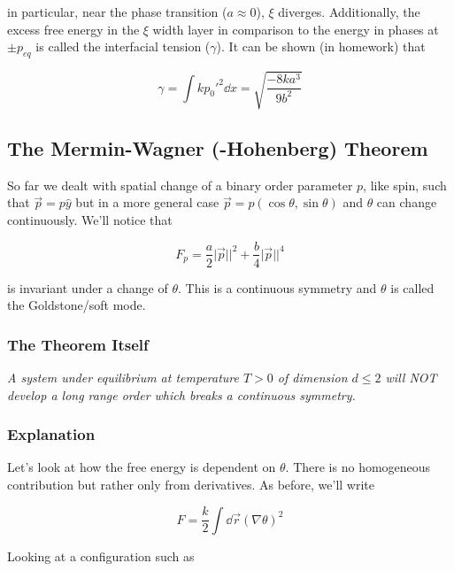 in particular, near the phase transition (\(a\approx 0\)), \(\xi \) diverges. Additionally, the excess free energy in the \(\xi \) width layer in comparison to the energy in phases at \(\pm p_{eq}\) is called the interfacial tension (\(\gamma \)). It can be shown (in homework) that 

\begin{equation}
	\gamma = \int kp_0'^2\dd x = \sqrt{\frac{-8ka^3}{9b^2}}
\end{equation}

\subsection{The Mermin-Wagner (-Hohenberg) Theorem}

So far we dealt with spatial change of a binary order parameter \(p\), like spin, such that \(\vec{p} = p\hat y\) but in a more general case \(\vec{p} = p(\cos\theta,\sin\theta)\) and \(\theta \) can change continuously. We'll notice that

\begin{equation}
	F_p = \frac{a}{2}\lvert\vec p\rvert\rvert^2+\frac{b}{4}\lvert\vec p\rvert\rvert^4
\end{equation}

is invariant under a change of \(\theta \). This is a continuous symmetry and \(\theta \) is called the Goldstone/soft mode.

\subsubsection{The Theorem Itself}

\emph{A system under equilibrium at temperature \(T>0\) of dimension \(d\leq 2\) will NOT develop a long range order which breaks a continuous symmetry.}

\subsubsection{Explanation}

Let's look at how the free energy is dependent on \(\theta \). There is no homogeneous contribution but rather only from derivatives. As before, we'll write

\begin{equation}
	F = \frac{k}{2}\int \dd \vec r {(\nabla\theta)}^2
\end{equation}

Looking at a configuration such as

